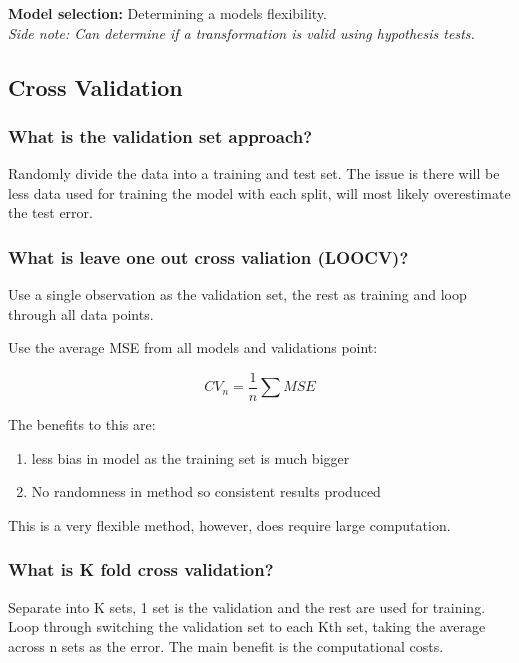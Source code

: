 \documentclass[11pt]{scrartcl} %
\begin{document}
\textbf{Model selection:} Determining a models flexibility.\\

\textit{Side note: Can determine if a transformation is valid using hypothesis tests.}

\subsection{Cross Validation}

\subsubsection{What is the validation set approach?}

Randomly divide the data into a training and test set. The issue is there will be less data used
for training the model with each split, will most likely overestimate the test error.

\subsubsection{What is leave one out cross valiation (LOOCV)?}

Use a single observation as the validation set, the rest as training and loop through all data points.

Use the average MSE from all models and validations point:

\begin{equation}
	CV_n = \frac{1}{n} \sum MSE
\end{equation}

The benefits to this are:
\begin{enumerate}
	\item less bias in model as the training set is much bigger
	\item No randomness in method so consistent results produced
\end{enumerate}

This is a very flexible method, however, does require large computation.

\subsubsection{What is K fold cross validation?}

Separate into K sets, 1 set is the validation and the rest are used for training. Loop through switching
the validation set to each Kth set, taking the average across n sets as the error. 
The main benefit is the computational costs.
\end{document}

